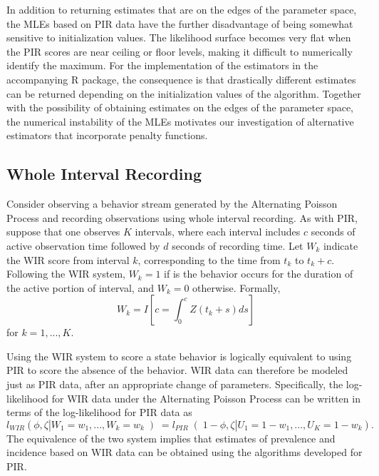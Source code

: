 \documentclass[man, noextraspace, floatsintext]{apa6}\usepackage[]{graphicx}\usepackage[]{color}
\begin{document}
In addition to returning estimates that are on the edges of the parameter space, the MLEs based on PIR data have the further disadvantage of being somewhat sensitive to initialization values. 
The likelihood surface becomes very flat when the PIR scores are near ceiling or floor levels, making it difficult to numerically identify the maximum. 
For the implementation of the estimators in the accompanying R package, the consequence is that drastically different estimates can be returned depending on the initialization values of the algorithm. 
Together with the possibility of obtaining estimates on the edges of the parameter space, the numerical instability of the MLEs motivates our investigation of alternative estimators that incorporate penalty functions.  

\subsection{Whole Interval Recording}
\label{sec:WIR}

Consider observing a behavior stream generated by the Alternating Poisson Process and recording observations using whole interval recording. 
As with PIR, suppose that one observes $K$ intervals, where each interval includes $c$ seconds of active observation time followed by $d$ seconds of recording time. 
Let $W_k$ indicate the WIR score from interval $k$, corresponding to the time from $t_k$ to $t_k + c$. 
Following the WIR system, $W_k = 1$ if is the behavior occurs for the duration of the active portion of interval, and $W_k = 0$ otherwise. 
Formally, 
\begin{equation}
W_k = I\left[ c = \int_0^c Z\left(t_k + s \right) ds\right]
\end{equation}
for $k = 1,...,K$. 

Using the WIR system to score a state behavior is logically equivalent to using PIR to score the absence of the behavior. 
WIR data can therefore be modeled just as PIR data, after an appropriate change of parameters. 
Specifically, the log-likelihood for WIR data under the Alternating Poisson Process can be written in terms of the log-likelihood for PIR data as
\begin{equation}
l_{WIR}\left(\phi, \zeta | W_1 = w_1,...,W_k = w_k \left) = l_{PIR}\right(1 - \phi, \zeta | U_1 = 1 - w_1,...,U_K = 1 - w_k\right).
\end{equation}
The equivalence of the two system implies that estimates of prevalence and incidence based on WIR data can be obtained using the algorithms developed for PIR. 
\end{document}
